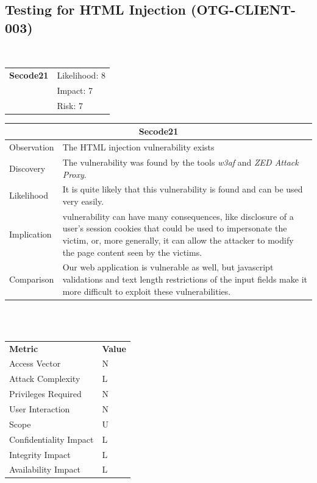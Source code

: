 \documentclass[headsepline,footsepline,footinclude=false,oneside,fontsize=11pt,paper=a4,listof=totoc,bibliography=totoc]{scrbook} %
\begin{document}
\subsection{Testing for HTML Injection (OTG-CLIENT-003)}\
\begin{tabular}{cR{12cm}}
	\textbf{Secode21} & Likelihood: 8\\& Impact: 7\\& Risk: 7
\end{tabular}

\begin{tabular}{ l|p{11cm}  }
	\hline
	\multicolumn{2}{c}{\textbf{Secode21}} \\
	\hline
	Observation   & The HTML injection vulnerability exists  \\
	Discovery  & The vulnerability was found by the tools \textit{w3af} and \textit{ZED Attack Proxy}. \\
	Likelihood & It is quite likely that this vulnerability is found and can be used very easily. \\
	Implication    &  vulnerability can have many consequences, like disclosure of a user's session cookies that could be used to impersonate the victim, or, more generally, it can allow the attacker to modify the page content seen by the victims. \\
	Comparison & Our web application is vulnerable as well, but javascript validations and text length restrictions of the input fields make it more difficult to exploit these vulnerabilities. \\
	\hline
\end{tabular}
\\
\vspace{0.5cm}
\\
\begin{center}
	\begin{tabular}{ll}
		\rowcolor[HTML]{34CDF9}
		{\color[HTML]{ECF4FF} \textbf{Metric}}        & {\color[HTML]{ECF4FF} \textbf{Value}} \\
		\rowcolor[HTML]{BBDAFF}
		{\color[HTML]{333333} Access Vector}          & {\color[HTML]{333333} } N              \\
		\rowcolor[HTML]{ECF4FF}
		{\color[HTML]{333333} Attack Complexity}      & {\color[HTML]{333333} } L              \\
		\rowcolor[HTML]{BBDAFF}
		{\color[HTML]{333333} Privileges Required}    & {\color[HTML]{333333} } N              \\
		\rowcolor[HTML]{ECF4FF}
		{\color[HTML]{333333} User Interaction}       & {\color[HTML]{333333} } N              \\
		\rowcolor[HTML]{BBDAFF}
		{\color[HTML]{333333} Scope}                  & {\color[HTML]{333333} } U              \\
		\rowcolor[HTML]{ECF4FF}
		{\color[HTML]{333333} Confidentiality Impact} & {\color[HTML]{333333} } L              \\
		\rowcolor[HTML]{BBDAFF}
		{\color[HTML]{333333} Integrity Impact}       & {\color[HTML]{333333} } L              \\
		\rowcolor[HTML]{ECF4FF}
		{\color[HTML]{333333} Availability Impact}    & {\color[HTML]{333333} } L
	\end{tabular}
\end{center}
\end{document}
